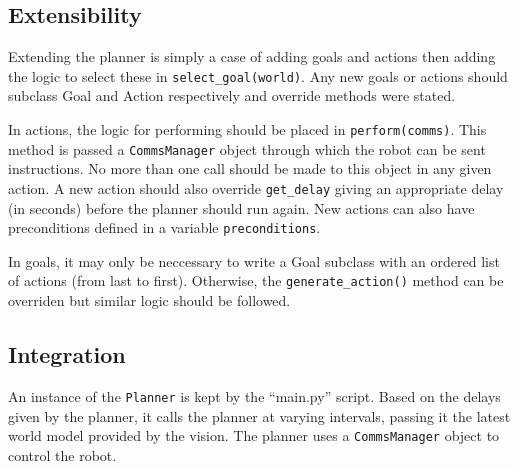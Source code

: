 \subsection{Extensibility}

Extending the planner is simply a case of adding goals and actions then adding the logic to select these in \texttt{select\_goal(world)}. Any new goals or actions should subclass Goal and Action respectively and override methods were stated.

In actions, the logic for performing should be placed in \texttt{perform(comms)}. This method is passed a \texttt{CommsManager} object through which the robot can be sent instructions. No more than one call should be made to this object in any given action. A new action should also override \texttt{get\_delay} giving an appropriate delay (in seconds) before the planner should run again. New actions can also have preconditions defined in a variable \texttt{preconditions}.

In goals, it may only be neccessary to write a Goal subclass with an ordered list of actions (from last to first). Otherwise, the \texttt{generate\_action()} method can be overriden but similar logic should be followed.

\subsection{Integration}

An instance of the \texttt{Planner} is kept by the ``main.py'' script. Based on the delays given by the planner, it calls the planner at varying intervals, passing it the latest world model provided by the vision. The planner uses a \texttt{CommsManager} object to control the robot.
